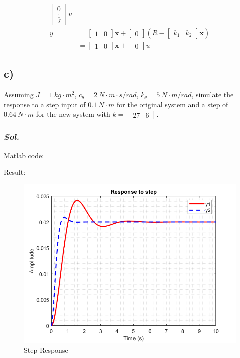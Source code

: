 \begin{equation}
\begin{split}
\begin{bmatrix}
            0\\
            \frac{1}{J}
        \end{bmatrix}u\\ 
        y &=
        \begin{bmatrix}
            1 & 0
        \end{bmatrix}
        \textbf{x} + 
        \begin{bmatrix}
            0
        \end{bmatrix}
        \left(R - \begin{bmatrix} k_1 & k_2 \end{bmatrix}
        \textbf{x}
        \right) \\
        &= \begin{bmatrix}
            1 & 0
        \end{bmatrix}
        \textbf{x} + 
        \begin{bmatrix}
            0
        \end{bmatrix}u
    \end{split}
\end{equation}

\subsection{c)}
Assuming $J = 1\ kg\cdot m^2$, $c_{\theta} =2\ N\cdot m\cdot s/rad$, $k_{\theta} =5\ N\cdot m/rad$, simulate the response to a step input of $0.1\ N\cdot m$ for the original system and a step of $0.64\ N\cdot m$ for the new system with $k =\begin{bmatrix}27 & 6\end{bmatrix}$.

\subsubsection{\textit{ Sol. }}
Matlab code:

Result:
\begin{figure}[htp]
    \centering
    \includegraphics[width=15cm]{images/Q3_c_fig.png}
    \caption{Step Response}
    \label{fig:Q3c}
\end{figure}
\pagebreak